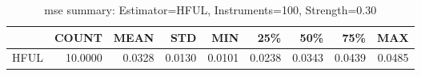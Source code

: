 \begin{table}[ht]
\centering
\caption{mse summary: Estimator=HFUL, Instruments=100, Strength=0.30}
\begin{tabular}{lrrrrrrrr}
\toprule
 & COUNT & MEAN & STD & MIN & 25\% & 50\% & 75\% & MAX \\
\midrule
HFUL & 10.0000 & 0.0328 & 0.0130 & 0.0101 & 0.0238 & 0.0343 & 0.0439 & 0.0485 \\
\bottomrule
\end{tabular}
\end{table}
